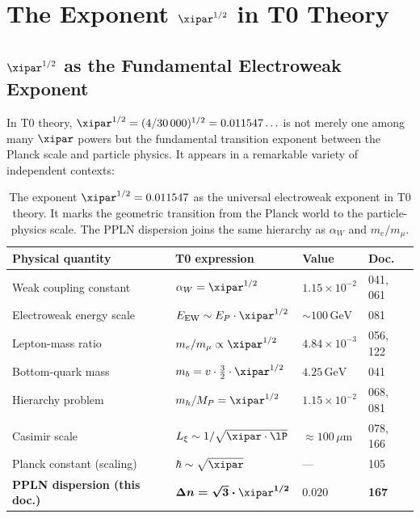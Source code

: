 \clearpage

\section{The Exponent \texorpdfstring{$\xipar^{1/2}$}{xi\^{}(1/2)} in T0 Theory}
\label{sec:xi_half}

\subsection{%
  \texorpdfstring{$\xipar^{1/2}$}{xi\^{}(1/2)} as the Fundamental
  Electroweak Exponent}

In T0 theory, $\xipar^{1/2} = (4/30\,000)^{1/2} = 0.011547\ldots$ is not
merely one among many $\xipar$ powers but the fundamental transition exponent
between the Planck scale and particle physics. It appears in a remarkable
variety of independent contexts:

\begin{table}[H]
    \centering
    \begin{tabular}{llll}
        \toprule
        \textbf{Physical quantity} & \textbf{T0 expression} &
        \textbf{Value} & \textbf{Doc.} \\
        \midrule
        Weak coupling constant &
            $\alpha_W = \xipar^{1/2}$ &
            $1.15 \times 10^{-2}$ & 041, 061 \\
        Electroweak energy scale &
            $E_\mathrm{EW} \sim E_P \cdot \xipar^{1/2}$ &
            $\sim 100\,\text{GeV}$ & 081 \\
        Lepton-mass ratio &
            $m_e/m_\mu \propto \xipar^{1/2}$ &
            $4.84 \times 10^{-3}$ & 056, 122 \\
        Bottom-quark mass &
            $m_b = v \cdot \tfrac{3}{2}\cdot\xipar^{1/2}$ &
            $4.25\,\text{GeV}$ & 041 \\
        Hierarchy problem &
            $m_h/M_P = \xipar^{1/2}$ &
            $1.15 \times 10^{-2}$ & 068, 081 \\
        Casimir scale &
            $L_\xi \sim 1/\sqrt{\xipar \cdot \lP}$ &
            $\approx 100\,\mu\text{m}$ & 078, 166 \\
        Planck constant (scaling) &
            $\hbar \sim \sqrt{\xipar}$ & — & 105 \\
        \textbf{PPLN dispersion (this doc.)} &
            $\boldsymbol{\Delta n = \sqrt{3}\cdot\xipar^{1/2}}$ &
            $\mathbf{0.020}$ & \textbf{167} \\
        \bottomrule
    \end{tabular}
    \caption{The exponent $\xipar^{1/2} = 0.011547$ as the universal
    electroweak exponent in T0 theory. It marks the geometric transition
    from the Planck world to the particle-physics scale. The PPLN dispersion
    joins the same hierarchy as $\alpha_W$ and $m_e/m_\mu$.}
    \label{tab:xi12}
\end{table}

